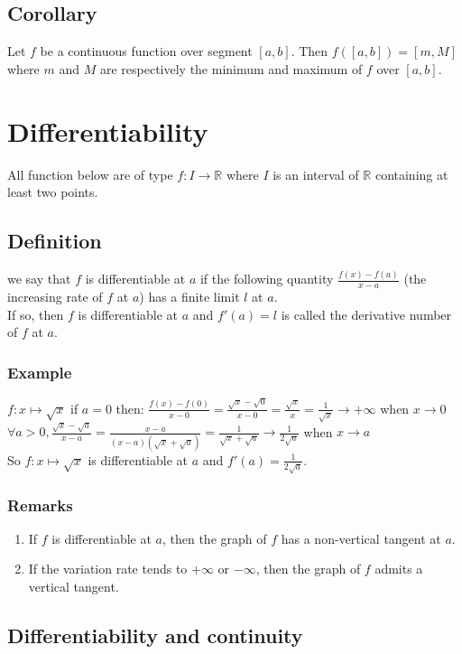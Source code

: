 \documentclass[notitlepage]{math}
\begin{document}
\subsection{Corollary}
Let $f$ be a continuous function over segment $[a,b]$. Then $f([a,b]) = [m,M]$ where $m$ and $M$ are respectively the minimum and maximum of $f$ over $[a,b]$.
\section{Differentiability}
All function below are of type $f: I \to \mathbb{R}$ where $I$ is an interval of $\mathbb{R}$ containing at least two points.
\subsection{Definition}
we say that $f$ is differentiable at $a$ if the following quantity $\frac{f(x)-f(a)}{x-a}$ (the increasing rate of $f$ at $a$) has a finite limit $l$ at $a$.\\
If so, then $f$ is differentiable at $a$ and $f'(a) = l$ is called the derivative number of $f$ at $a$.
\subsubsection{Example}
\noindent $f : x \mapsto \sqrt{x}$ if $a = 0$ then: $\frac{f(x)-f(0)}{x-0} = \frac{\sqrt{x}-\sqrt{0}}{x-0} = \frac{\sqrt{x}}{x}= \frac{1}{\sqrt{x}} \rightarrow +\infty$ when $x \rightarrow 0$\\
$\forall a > 0, \frac{\sqrt{x}-\sqrt{a}}{x-a} = \frac{x-a}{(x-a)(\sqrt{x}+\sqrt{a})} = \frac{1}{\sqrt{x}+\sqrt{a}} \rightarrow \frac{1}{2\sqrt{a}}$ when $x \rightarrow a$\\
So $f : x \mapsto \sqrt{x}$ is differentiable at $a$ and $f'(a) = \frac{1}{2\sqrt{a}}$.
\subsubsection{Remarks}
\begin{enumerate}[label=\protect\circled{\arabic*}]
    \item If $f$ is differentiable at $a$, then the graph of $f$ has a non-vertical tangent at $a$.
    \item If the variation rate tends to $+\infty$ or $-\infty$, then the graph of $f$ admits a vertical tangent.
\end{enumerate}
\subsection{Differentiability and continuity}
\end{document}
